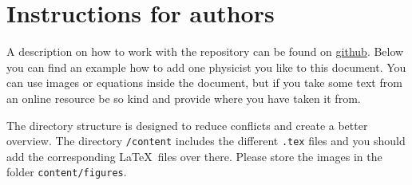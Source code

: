 \section*{Instructions for authors}

A description on how to work with the repository can be found on \href{https://github.com/ahelm/my-favorite-physicist}{github}. Below you can find an example how to add one physicist you like to this document. You can use images or equations inside the document, but if you take some text from an online resource be so kind and provide where you have taken it from.

The directory structure is designed to reduce conflicts and create a better overview. The directory \texttt{/content} includes the different \texttt{.tex} files and you should add the corresponding \LaTeX\ files over there. Please store the images in the folder \texttt{content/figures}.